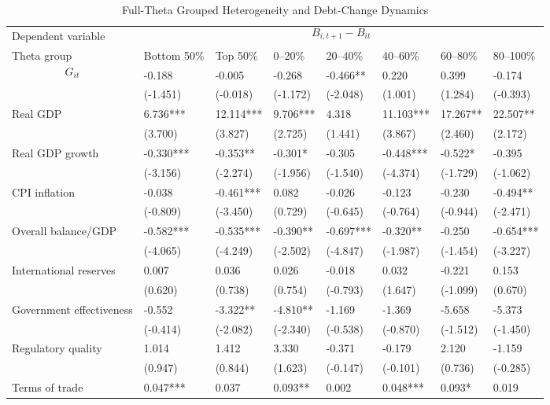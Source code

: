 \begin{table}[H]\centering
\begin{threeparttable}
\caption{Full-Theta Grouped Heterogeneity and Debt-Change Dynamics}
\label{tab:theta_group_heterogeneity_debt}
\scriptsize
\begin{tabularx}{\textwidth}{lYYYYYYY}
\toprule
Dependent variable &  \\
\cmidrule(lr){2-8}
Theta group & Bottom 50\% & Top 50\% & 0--20\% & 20--40\% & 40--60\% & 60--80\% & 80--100\% \\
\midrule
$$G_{it}$$ & -0.188 & -0.005 & -0.268 & -0.466** & 0.220 & 0.399 & -0.174 \\
  & (-1.451) & (-0.018) & (-1.172) & (-2.048) & (1.001) & (1.284) & (-0.393) \\
Real GDP & 6.736*** & 12.114*** & 9.706*** & 4.318 & 11.103*** & 17.267** & 22.507** \\
  & (3.700) & (3.827) & (2.725) & (1.441) & (3.867) & (2.460) & (2.172) \\
Real GDP growth & -0.330*** & -0.353** & -0.301* & -0.305 & -0.448*** & -0.522* & -0.395 \\
  & (-3.156) & (-2.274) & (-1.956) & (-1.540) & (-4.374) & (-1.729) & (-1.062) \\
CPI inflation & -0.038 & -0.461*** & 0.082 & -0.026 & -0.123 & -0.230 & -0.494** \\
  & (-0.809) & (-3.450) & (0.729) & (-0.645) & (-0.764) & (-0.944) & (-2.471) \\
Overall balance/GDP & -0.582*** & -0.535*** & -0.390** & -0.697*** & -0.320** & -0.250 & -0.654*** \\
  & (-4.065) & (-4.249) & (-2.502) & (-4.847) & (-1.987) & (-1.454) & (-3.227) \\
International reserves & 0.007 & 0.036 & 0.026 & -0.018 & 0.032 & -0.221 & 0.153 \\
  & (0.620) & (0.738) & (0.754) & (-0.793) & (1.647) & (-1.099) & (0.670) \\
Government effectiveness & -0.552 & -3.322** & -4.810** & -1.169 & -1.369 & -5.658 & -5.373 \\
  & (-0.414) & (-2.082) & (-2.340) & (-0.538) & (-0.870) & (-1.512) & (-1.450) \\
Regulatory quality & 1.014 & 1.412 & 3.330 & -0.371 & -0.179 & 2.120 & -1.159 \\
  & (0.947) & (0.844) & (1.623) & (-0.147) & (-0.101) & (0.736) & (-0.285) \\
Terms of trade & 0.047*** & 0.037 & 0.093** & 0.002 & 0.048*** & 0.093* & 0.019 \\

\end{tabularx}
\end{threeparttable}
\end{table}
